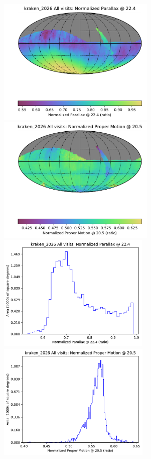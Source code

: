 \documentclass[DM,authoryear,toc]{lsstdoc}
\begin{document}
\begin{figure}[htb]
\centering
\includegraphics[height=2.4in]{figures/kraken_2026_Normalized_Parallax_@_22_4_All_visits_HEAL_SkyMap}
\includegraphics[height=2.4in]{figures/kraken_2026_Normalized_Proper_Motion_@_20_5_All_visits_HEAL_SkyMap} \\
\includegraphics[height=2.2in]{figures/kraken_2026_Normalized_Parallax_@_22_4_All_visits_HEAL_Histogram}
\includegraphics[height=2.2in]{figures/kraken_2026_Normalized_Proper_Motion_@_20_5_All_visits_HEAL_Histogram}

\end{figure}
\end{document}
